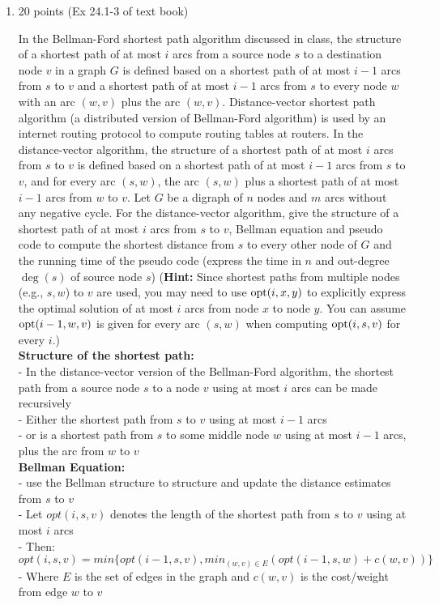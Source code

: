 \documentclass[letterpaper,12pt]{article}
\newcommand{\opt}{{\mathop{\rm opt}}}
\begin{document}
\begin{enumerate}
\noindent\rule{16cm}{0.1pt}
\item 20 points (Ex 24.1-3 of text book) 

In the Bellman-Ford shortest path algorithm discussed in class, the structure of a 
shortest path of at most $i$ arcs from a source node $s$ to a destination node $v$ 
in a graph $G$ is defined based on a shortest path of at most $i-1$ arcs from $s$ to 
$v$ and a shortest path of at most $i-1$ arcs from $s$ to every node $w$ with an arc 
$(w,v)$ plus the arc $(w,v)$. Distance-vector shortest path algorithm (a distributed 
version of Bellman-Ford algorithm) is used by an internet routing protocol to compute 
routing tables at routers. In the distance-vector algorithm, the structure of a shortest 
path of at most $i$ arcs from $s$ to $v$ is defined based on a shortest path of at most 
$i-1$ arcs from $s$ to $v$, and for every arc $(s,w)$, the arc $(s,w)$ plus a shortest 
path of at most $i-1$ arcs from $w$ to $v$. Let $G$ be a digraph of $n$ nodes and $m$ 
arcs without any negative cycle. For the distance-vector algorithm, give the structure 
of a shortest path of at most $i$ arcs from $s$ to $v$, Bellman equation and pseudo code 
to compute the shortest distance from $s$ to every other node of $G$ and the running time 
of the pseudo code (express the time in $n$ and out-degree $\deg(s)$ of source node
$s$) ({\bf Hint:} Since shortest paths from multiple nodes (e.g., $s,w$) to $v$ are
used, you may need to use $\opt(i,x,y)$ to explicitly express the optimal solution
of at most $i$ arcs from node $x$ to node $y$. You can assume $\opt(i-1,w,v)$ is
given for every arc $(s,w)$ when computing $\opt(i,s,v)$ for every $i$.) \\

\textbf{Structure of the shortest path:} \\
- In the distance-vector version of the Bellman-Ford algorithm, the shortest path from a source node $s$ to a node $v$ using at most $i$ arcs can be made recursively \\
- Either the shortest path from $s$ to $v$ using at most $i-1$ arcs \\
- or is a shortest path from $s$ to some middle node $w$ using at most $i-1$ arcs, plus the arc from $w$ to $v$ \\

\textbf{Bellman Equation:} \\
- use the Bellman structure to structure and update the distance estimates from $s$ to $v$ \\
- Let $opt(i, s, v)$ denotes the length of the shortest path from $s$ to $v$ using at most $i$ arcs \\
- Then: $opt(i,s,v) = min \{opt(i-1,s,v), min_{(w,v)\in E}(opt(i-1,s,w)+c(w,v))\}$ \\
- Where $E$ is the set of edges in the graph and $c(w,v)$ is the cost/weight from edge $w$ to $v$ \\


\end{enumerate}
\end{document}
